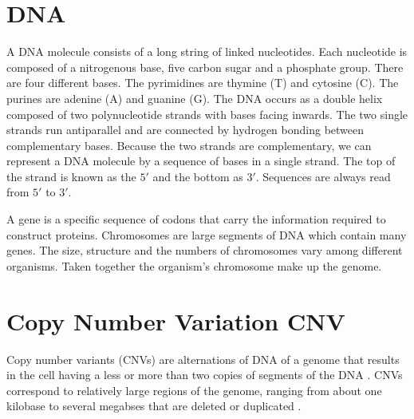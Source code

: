 \section{DNA}
A DNA molecule consists of a long string of linked nucleotides.
Each nucleotide is composed of a nitrogenous base, five carbon sugar and a 
phosphate group. There are four different bases. The pyrimidines are
thymine (T) and cytosine (C). The purines are adenine (A) and guanine (G).
The DNA occurs as a double helix composed of two polynucleotide strands
with bases facing inwards. The two single strands run antiparallel and are connected
by hydrogen bonding between complementary bases. Because the two strands are complementary,
we can represent a DNA molecule by a sequence of bases in a single strand.
The top of the strand is known as the $5'$ and the bottom as $3'$. Sequences are always read from
$5'$ to $3'$.


A gene is a specific sequence of codons that carry the information required to construct proteins. Chromosomes are large segments of DNA which contain many genes. The size, structure and the numbers
of chromosomes vary among different organisms. Taken together the organism's   chromosome make up the genome.

\section{Copy Number Variation CNV}

Copy number variants (CNVs) are alternations of DNA of a genome that results
in the cell having a less or more than two copies of segments of the DNA \citep{cai2012}.
CNVs correspond to relatively large regions of the genome, ranging from about one kilobase
to several megabses that are deleted or duplicated \cite{cai2012}.

